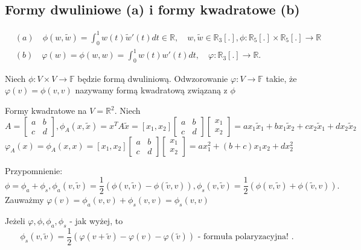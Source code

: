\documentclass[../main.tex]{subfiles}
\begin{document}
\subsection{Formy dwuliniowe (a) i formy kwadratowe (b)}
    \begin{align*}
        &(a)\quad \phi(w,\tilde w) = \int_0^1 w(t)\tilde w'(t) dt \in \mathbb{R},\quad w,\tilde w\in \mathbb{R}_3[.], \phi: \mathbb{R}_5[.] \times \mathbb{R}_5[.] \to \mathbb{R}\\
        &(b)\quad \varphi(w) = \phi(w,w) = \int_0^1 w(t)w'(t)dt,\quad \varphi: \mathbb{R}_3[.]\to \mathbb{R}
    .\end{align*}

    \begin{definicja}
        Niech $\phi: V \times V \to \mathbb{F}$ będzie formą dwuliniową. Odwzorowanie $\varphi: V\to \mathbb{F}$ takie, że $\varphi(v) = \phi(v,v)$ nazywamy formą kwadratową związaną z $\phi$
    \end{definicja}
    \begin{przyklad}
        Formy kwadratowe na $V=\mathbb{R}^2$. Niech $A=\begin{bmatrix} a&b\\c&d \end{bmatrix} , \phi_A(x,\tilde x) = x^T A \tilde x = \left[ x_1,x_2 \right] \begin{bmatrix} a&b\\c&d \end{bmatrix} \begin{bmatrix} x_1\\x_2 \end{bmatrix} = ax_1 \tilde x_1 + bx_1 \tilde x_2 + cx_2 \tilde x_1 + dx_2 \tilde x_2$\\
        $\varphi_A(x) = \phi_A(x,x) = \left[ x_1,x_2 \right] \begin{bmatrix} a&b\\c&d \end{bmatrix} \begin{bmatrix} x_1\\x_2 \end{bmatrix} = ax_1^2 + (b+c)x_1x_2 + dx_2^2$
    \end{przyklad}
    Przypomnienie: \[
        \phi = \phi_a + \phi_s, \phi_a(v,\tilde v) = \frac{1}{2}(\phi(v,\tilde v) - \phi(\tilde v,v)), \phi_s(v,\tilde v) = \frac{1}{2}(\phi(v,\tilde v)+\phi(\tilde v,v))
    .\]
    Zauważmy $\varphi(v) = \phi_a(v,v) + \phi_s(v,v) = \phi_s(v,v)$
    \begin{stw}
        Jeżeli $\varphi,\phi,\phi_a,\phi_s$ - jak wyżej, to \[
            \phi_s(v,\tilde v) = \frac{1}{2}(\varphi(v+\tilde v) - \varphi(v) - \varphi(\tilde v)) \text{ - formuła polaryzacyjna! }
        .\]
    \end{stw}
\end{document}

